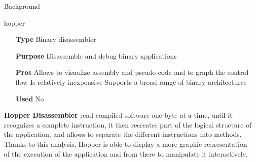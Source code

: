 \begin{chaptercover}{Background}
\begin{solutiondata}{hopper}
\begin{itemize}[labelsep=1cm]
  \item [\textbf{Type}] Binary disassembler
  \item [\textbf{Purpose}] Disassemble and debug binary applications
  \item [\textbf{Pros}] Allows to visualize assembly and pseudo-code and to graph the control flow \newline Is relatively inexpensive \newline Supports a broad range of binary architectures
  \item [\textbf{Used}] No
\end{itemize}
\end{solutiondata}

\textbf{Hopper Disassembler} \cite{hopper} read compiled software one byte at a time, until it recognizes a complete instruction, it then recreates part of the logical structure of the application, and allows to separate the different instructions into methods. Thanks to this analysis, Hopper is able to display a more graphic representation of the execution of the application and from there to manipulate it interactively.

\end{chaptercover}
